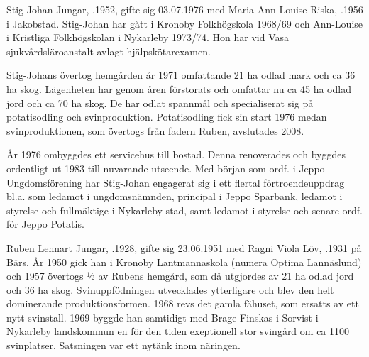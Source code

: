 %



%
Stig-Johan Jungar, .1952, gifte sig 03.07.1976 med Maria Ann-Louise Riska, .1956 i Jakobstad. Stig-Johan har gått i Kronoby Folkhögskola 1968/69 och Ann-Louise i Kristliga Folkhögskolan i Nykarleby 1973/74. Hon har vid Vasa sjukvårdsläroanstalt avlagt hjälpskötarexamen.

Stig-Johans övertog hemgården år 1971 omfattande 21 ha odlad mark och ca 36 ha skog. Lägenheten har genom åren förstorats och omfattar nu ca 45 ha odlad jord och ca 70 ha skog. De har odlat spannmål och specialiserat sig på potatisodling och svinproduktion.  Potatisodling fick sin start 1976 medan svinproduktionen, som övertogs från fadern Ruben, avslutades 2008.

År 1976 ombyggdes ett servicehus till bostad. Denna renoverades och byggdes ordentligt ut 1983 till nuvarande utseende. Med början som ordf. i Jeppo Ungdomsförening har Stig-Johan engagerat sig i ett flertal förtroendeuppdrag bl.a. som ledamot i ungdomsnämnden, principal i Jeppo Sparbank, ledamot i styrelse och fullmäktige i Nykarleby stad, samt ledamot i styrelse och senare ordf. för Jeppo Potatis.


%



%
Ruben Lennart Jungar, .1928, gifte sig 23.06.1951 med Ragni Viola Löv, .1931 på Bärs. År 1950 gick han i Kronoby Lantmannaskola (numera Optima Lannäslund) och 1957 övertogs ½ av Rubens hemgård, som då utgjordes av 21 ha odlad jord och 36 ha skog. Svinuppfödningen utvecklades ytterligare och blev den helt dominerande produktionsformen. 1968 revs det gamla fähuset, som ersatts av ett nytt svinstall. 1969 byggde han samtidigt med Brage Finskas i Sorvist i Nykarleby landskommun en för den tiden exeptionell stor svingård om ca 1100 svinplatser. Satsningen var ett nytänk inom näringen.

